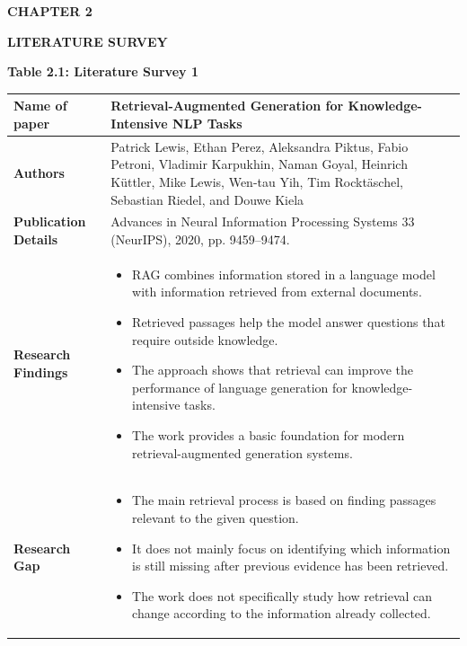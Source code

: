 \documentclass[12pt,a4paper]{report}
\newcommand{\chaptertitle}[2]{
    \begin{center}
        {\fontsize{18}{21}\selectfont\bfseries CHAPTER #1\par}
        \vspace{0.10in}
        {\fontsize{18}{21}\selectfont\bfseries #2\par}
    \end{center}
    \vspace{0.12in}
}
\begin{document}

\chaptertitle{2}{LITERATURE SURVEY}
\small

\begin{center}\textbf{Table 2.1: Literature Survey 1}\end{center}
\begin{longtable}{|p{1.25in}|p{5.15in}|}
\hline
\textbf{Name of paper} & Retrieval-Augmented Generation for Knowledge-Intensive NLP Tasks \\ \hline

\textbf{Authors} & Patrick Lewis, Ethan Perez, Aleksandra Piktus, Fabio Petroni, Vladimir Karpukhin, Naman Goyal, Heinrich K\"uttler, Mike Lewis, Wen-tau Yih, Tim Rockt\"aschel, Sebastian Riedel, and Douwe Kiela \\ \hline

\textbf{Publication Details} & Advances in Neural Information Processing Systems 33 (NeurIPS), 2020, pp. 9459--9474. \\ \hline

\textbf{Research Findings} &
\begin{itemize}[leftmargin=0.18in,itemsep=0.05in,topsep=0pt,parsep=0pt]
\item RAG combines information stored in a language model with information retrieved from external documents.
\item Retrieved passages help the model answer questions that require outside knowledge.
\item The approach shows that retrieval can improve the performance of language generation for knowledge-intensive tasks.
\item The work provides a basic foundation for modern retrieval-augmented generation systems.
\end{itemize} \\ \hline

\textbf{Research Gap} &
\begin{itemize}[leftmargin=0.18in,itemsep=0.05in,topsep=0pt,parsep=0pt]
\item The main retrieval process is based on finding passages relevant to the given question.
\item It does not mainly focus on identifying which information is still missing after previous evidence has been retrieved.
\item The work does not specifically study how retrieval can change according to the information already collected.
\end{itemize} \\ \hline


\end{longtable}
\end{document}
